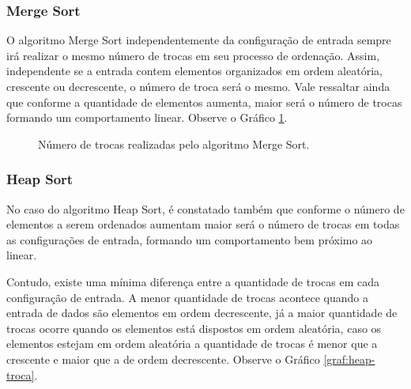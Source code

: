 \documentclass[conference,onecolumn]{IEEEtran}
\begin{document}
\subsubsection{Merge Sort}

O algoritmo Merge Sort independentemente da configuração de entrada sempre irá realizar o mesmo número de trocas em seu processo de ordenação. Assim, independente se a entrada contem elementos organizados em ordem aleatória, crescente ou decrescente, o número de troca será o mesmo. Vale ressaltar ainda que conforme a quantidade de elementos aumenta, maior será o número de trocas formando um comportamento linear. Observe o Gráfico \ref{graf:merge-troca}.

\begin{figure}[H]
\begin{center}
\end{center}
\caption{Número de trocas realizadas pelo algoritmo Merge Sort.}
\label{graf:merge-troca}
\end{figure}

\subsubsection{Heap Sort}

No caso do algoritmo Heap Sort, é constatado também que conforme o número de elementos a serem ordenados aumentam maior será o número de trocas em todas as configurações de entrada, formando um comportamento bem próximo ao linear. 

Contudo, existe uma mínima diferença entre a quantidade de trocas em cada configuração de entrada. A menor quantidade de trocas acontece quando a entrada de dados são elementos em ordem decrescente, já a maior quantidade de trocas ocorre quando os elementos está dispostos em ordem aleatória, caso os elementos estejam em ordem aleatória a quantidade de trocas é menor que a crescente e maior que a de ordem decrescente. Observe o Gráfico \ref{graf:heap-troca}.
\end{document}
